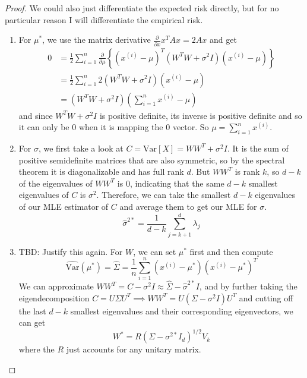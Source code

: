  \begin{proof}
    We could also just differentiate the expected risk directly, but for no particular reason I will differentiate the empirical risk. 
    \begin{enumerate}
      \item For $\mu^\ast$, we use the matrix derivative $\frac{\partial}{\partial x} x^T A x = 2 A x$ and get 
      \begin{align}
        0 & = \frac{1}{2} \sum_{i=1}^n \frac{\partial}{\partial \mu} \left\{ (x^{(i)} - \mu)^T (W^T W + \sigma^2 I) (x^{(i)} - \mu) \right\} \\ 
          & = \frac{1}{2} \sum_{i=1}^n 2 (W^T W + \sigma^2 I) (x^{(i)} - \mu) \\ 
          & = (W^T W + \sigma^2 I) \left( \sum_{i=1}^n x^{(i)} - \mu \right)
      \end{align} 
      and since $W^T W + \sigma^2 I$ is positive definite, its inverse is positive definite and so it can only be $0$ when it is mapping the $0$ vector. So $\mu = \sum_{i=1}^n x^{(i)}$. 

      \item For $\sigma$, we first take a look at $C = \mathrm{Var}[X] = W W^T + \sigma^2 I$. It is the sum of positive semidefinite matrices that are also symmetric, so by the spectral theorem it is diagonalizable and has full rank $d$. But $W W^T$ is rank $k$, so $d - k$ of the eigenvalues of $W W^T$ is $0$, indicating that the same $d-k$ smallest eigenvalues of $C$ is $\sigma^2$. Therefore, we can take the smallest $d-k$ eigenvalues of our MLE estimator of $C$ and average them to get our MLE for $\sigma$. 
      \begin{equation}
        \hat{\sigma}^{2\ast} = \frac{1}{d-k} \sum_{j=k+1}^d \lambda_j
      \end{equation}
      \item TBD: Justify this again. For $W$, we can set $\mu^\ast$ first and then compute 
      \begin{equation}
        \widehat{\mathrm{Var}}(\mu^{\ast}) = \hat{\Sigma} = \frac{1}{n} \sum_{i=1}^n (x^{(i)} - \mu^{\ast}) (x^{(i)} - \mu^{\ast})^T
      \end{equation}
      We can approximate $W W^T = C - \sigma^2 I \approx \hat{\Sigma} - \hat{\sigma}^{2\ast} I$, and by further taking the eigendecomposition $C = U \Sigma U^T \implies W W^T = U (\Sigma - \sigma^2 I) U^T$ and cutting off the last $d-k$ smallest eigenvalues and their corresponding eigenvectors, we can get 
      \begin{equation}
        W^{\ast} = R (\Sigma - \sigma^{2 \ast} I_d )^{1/2} V_k
      \end{equation}
      where the $R$ just accounts for any unitary matrix. 
    \end{enumerate}
  \end{proof}

